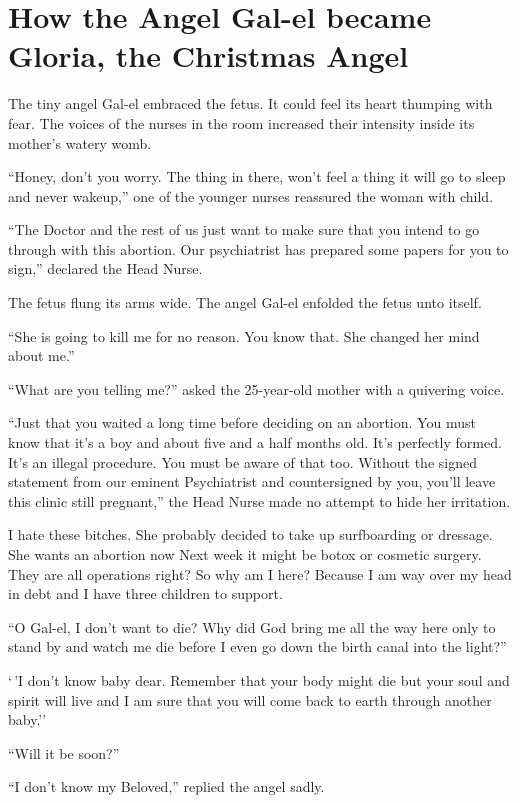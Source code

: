 \section{How the Angel Gal-el became Gloria, the Christmas Angel}

The tiny angel Gal-el embraced the fetus. It could feel its heart thumping with fear. The voices of the nurses in the room increased their intensity inside its mother's watery womb.

``Honey, don't you worry. The thing in there, won't feel a thing it will go to sleep and never wakeup,'' one of the younger nurses reassured the woman with child.

``The Doctor and the rest of us just want to make sure that you intend to go through with this abortion. Our psychiatrist has prepared some papers for you to sign,'' declared the Head Nurse.

The fetus flung its arms wide. The angel Gal-el enfolded the fetus unto itself.

``She is going to kill me for no reason. You know that. She changed her mind about me.''

``What are you telling me?'' asked the 25-year-old mother with a quivering voice.

``Just that you waited a long time before deciding on an abortion. You must know that it's a boy and about five and a half months old. It's perfectly formed. It's an illegal procedure. You must be aware of that too. Without the signed statement from our eminent Psychiatrist and countersigned by you, you'll leave this clinic still pregnant,'' the Head Nurse made no attempt to hide her irritation.

I hate these bitches. She probably decided to take up surfboarding or dressage. She wants an abortion now Next week it might be botox or cosmetic surgery. They are all operations right? So why am I here? Because I am way over my head in debt and I have three children to support.

``O Gal-el, I don't want to die? Why did God bring me all the way here only to stand by and watch me die before I even go down the birth canal into the light?''

`\,'I don't know baby dear. Remember that your body might die but your soul and spirit will live and I am sure that you will come back to earth through another baby.''

``Will it be soon?''

``I don't know my Beloved,'' replied the angel sadly.

